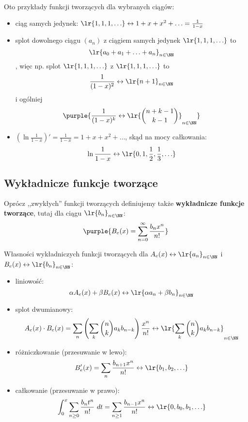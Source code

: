 \begin{example}
    Oto przykłady funkcji tworzących dla wybranych ciągów:
    \begin{itemize}
        \item ciąg samych jedynek: $\lr{1,1,1,\ldots} \leftrightarrow 1+x+x^2+\ldots=\frac{1}{1-x}$
        \item splot dowolnego ciągu $(a_n)$ z ciągiem samych jedynek $\lr{1,1,1,\ldots}$ to  $$\lr{a_0+a_1+\ldots+a_n}_{n\in\NN}$$, więc np. splot $\lr{1,1,1,\ldots}$ z $\lr{1,1,1,\ldots}$ to
        $$\frac{1}{(1-x)^2}\leftrightarrow \lr{n+1}_{n\in\NN}$$
        i ogólniej
        $$\purple{\frac{1}{(1-x)^k}\leftrightarrow \lr{\binom{n+k-1}{k-1}}_{n\in\NN}}$$
        \item $(\ln\frac{1}{1-x})'=\frac{1}{1-x}=1+x+x^2+\ldots$, skąd na mocy całkowania:
        $$\ln\frac{1}{1-x}\leftrightarrow \lr{0,1,\frac{1}{2},\frac{1}{3},\ldots}$$
    \end{itemize}
\end{example}

\subsection{Wykładnicze funkcje tworzące}

Oprócz ,,zwykłych'' funkcji tworzących definiujemy także \textbf{wykładnicze funkcje tworzące}, tutaj dla ciągu $\lr{b_n}_{n\in\NN}$:
$$\purple{B_e(x)=\sum_{n=0}^\infty\frac{b_nx^n}{n!}}$$

Własności wykładniczych funkcji tworzących dla $A_e(x)\leftrightarrow \lr{a_n}_{n\in\NN}$ i $B_e(x)\leftrightarrow \lr{b_n}_{n\in\NN}$:
\begin{itemize}
    \item liniowość: $$\alpha A_e(x) + \beta B_e(x) \leftrightarrow \lr{\alpha a_n + \beta b_n}_{n\in\NN}$$
    \item splot dwumianowy: $$A_e(x)\cdot B_e(x) = \sum_n\left(\sum_k\binom{n}{k}a_kb_{n-k}\right)\frac{x^n}{n!} \leftrightarrow \lr{\sum_k\binom{n}{k}a_kb_{n-k}}_{n \in \NN}$$
    \item różniczkowanie (przesuwanie w lewo): $$B_e'(x) = \sum_n \frac{b_{n+1}x^n}{n!} \leftrightarrow \lr{b_1, b_2, \ldots}$$
    \item całkowanie (przesuwanie w prawo): $$\int_0^x \sum_{n\geq0}\frac{b_nt^n}{n!}\ dt = \sum_{n\geq1}\frac{b_{n-1}x^n}{n!} \leftrightarrow \lr{0, b_0, b_1,\ldots}$$
\end{itemize}

